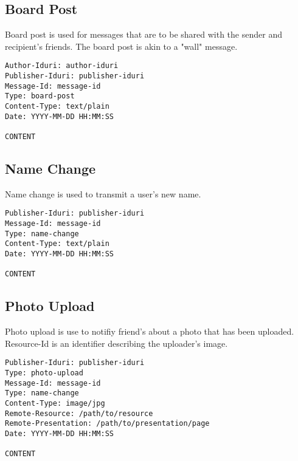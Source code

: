 \documentclass[letterpaper,11pt,oneside]{article}
\begin{document}
\subsection{Board Post}

Board post is used for messages that are to be shared with the sender and
recipient's friends. The board post is akin to a "wall" message.

\vspace{10pt}
\begin{verbatim}
Author-Iduri: author-iduri
Publisher-Iduri: publisher-iduri
Message-Id: message-id
Type: board-post
Content-Type: text/plain
Date: YYYY-MM-DD HH:MM:SS

CONTENT
\end{verbatim}
\vspace{10pt}

\subsection{Name Change}

Name change is used to transmit a user's new name.

\vspace{10pt}
\begin{verbatim}
Publisher-Iduri: publisher-iduri
Message-Id: message-id
Type: name-change
Content-Type: text/plain
Date: YYYY-MM-DD HH:MM:SS

CONTENT
\end{verbatim}
\vspace{10pt}

\subsection{Photo Upload}

Photo upload is use to notifiy friend's about a photo that has been uploaded.
Resource-Id is an identifier describing the uploader's image.

\vspace{10pt}
\begin{verbatim}
Publisher-Iduri: publisher-iduri
Type: photo-upload
Message-Id: message-id
Type: name-change
Content-Type: image/jpg
Remote-Resource: /path/to/resource
Remote-Presentation: /path/to/presentation/page
Date: YYYY-MM-DD HH:MM:SS

CONTENT
\end{verbatim}
\vspace{10pt}
\end{document}
